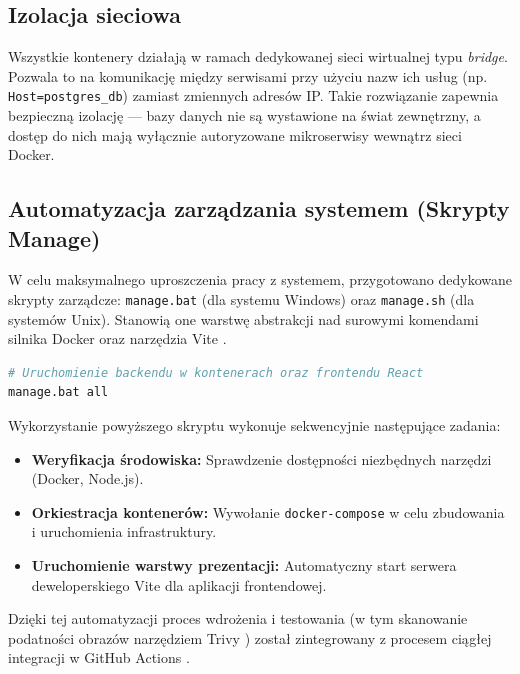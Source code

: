 \subsection{Izolacja sieciowa}
Wszystkie kontenery działają w ramach dedykowanej sieci wirtualnej typu \textit{bridge}. Pozwala to na komunikację między serwisami przy użyciu nazw ich usług (np. \texttt{Host=postgres\_db}) zamiast zmiennych adresów IP. Takie rozwiązanie zapewnia bezpieczną izolację — bazy danych nie są wystawione na świat zewnętrzny, a dostęp do nich mają wyłącznie autoryzowane mikroserwisy wewnątrz sieci Docker.

\subsection{Automatyzacja zarządzania systemem (Skrypty Manage)}
W celu maksymalnego uproszczenia pracy z systemem, przygotowano dedykowane skrypty zarządcze: \texttt{manage.bat} (dla systemu Windows) oraz \texttt{manage.sh} (dla systemów Unix). Stanowią one warstwę abstrakcji nad surowymi komendami silnika Docker oraz narzędzia Vite \cite{vite_guide}.

\begin{lstlisting}[language=bash, caption={Uruchomienie kompletnego środowiska za pomocą skryptu zarządczego}]
# Uruchomienie backendu w kontenerach oraz frontendu React
manage.bat all
\end{lstlisting}

Wykorzystanie powyższego skryptu wykonuje sekwencyjnie następujące zadania:
\begin{itemize}
    \item \textbf{Weryfikacja środowiska:} Sprawdzenie dostępności niezbędnych narzędzi (Docker, Node.js).
    \item \textbf{Orkiestracja kontenerów:} Wywołanie \texttt{docker-compose} w celu zbudowania i uruchomienia infrastruktury.
    \item \textbf{Uruchomienie warstwy prezentacji:} Automatyczny start serwera deweloperskiego Vite \cite{vite_guide} dla aplikacji frontendowej.
\end{itemize}

Dzięki tej automatyzacji proces wdrożenia i testowania (w tym skanowanie podatności obrazów narzędziem Trivy \cite{trivy_security}) został zintegrowany z procesem ciągłej integracji w GitHub Actions \cite{github_actions_docs}.